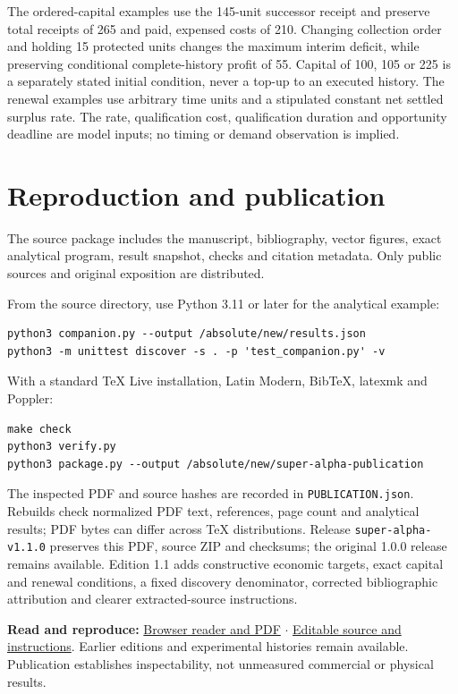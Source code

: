 \documentclass[11pt,letterpaper]{article}
\begin{document}
The ordered-capital examples use the 145-unit successor receipt and preserve total receipts of 265 and paid, expensed costs of 210. Changing collection order and holding 15 protected units changes the maximum interim deficit, while preserving conditional complete-history profit of 55. Capital of 100, 105 or 225 is a separately stated initial condition, never a top-up to an executed history. The renewal examples use arbitrary time units and a stipulated constant net settled surplus rate. The rate, qualification cost, qualification duration and opportunity deadline are model inputs; no timing or demand observation is implied.

\section{Reproduction and publication}
The source package includes the manuscript, bibliography, vector figures, exact analytical program, result snapshot, checks and citation metadata. Only public sources and original exposition are distributed.

From the source directory, use Python 3.11 or later for the analytical example:
\begin{lstlisting}
python3 companion.py --output /absolute/new/results.json
python3 -m unittest discover -s . -p 'test_companion.py' -v
\end{lstlisting}
With a standard TeX Live installation, Latin Modern, BibTeX, latexmk and Poppler:
\begin{lstlisting}
make check
python3 verify.py
python3 package.py --output /absolute/new/super-alpha-publication
\end{lstlisting}
The inspected PDF and source hashes are recorded in \texttt{PUBLICATION.json}. Rebuilds check normalized PDF text, references, page count and analytical results; PDF bytes can differ across TeX distributions. Release \texttt{super-alpha-v1.1.0} preserves this PDF, source ZIP and checksums; the original 1.0.0 release remains available. Edition 1.1 adds constructive economic targets, exact capital and renewal conditions, a fixed discovery denominator, corrected bibliographic attribution and clearer extracted-source instructions.

\textbf{Read and reproduce:} \href{https://montrealai.github.io/AGI-Alpha-Invention-Flywheel-Lab/super-alpha.html}{Browser reader and PDF} $\cdot$ \href{https://github.com/MontrealAI/AGI-Alpha-Invention-Flywheel-Lab/tree/main/docs/super-alpha}{Editable source and instructions}. Earlier editions and experimental histories remain available. Publication establishes inspectability, not unmeasured commercial or physical results.
\end{document}
